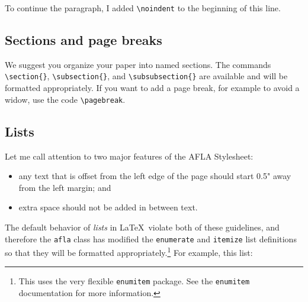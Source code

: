 \documentclass{afla}
\begin{document}
\noindent To continue the paragraph, I added \verb`\noindent` to the beginning of this line.

\subsection{Sections and page breaks}

We suggest you organize your paper into named sections. The commands \verb`\section{}`, \linebreak \verb`\subsection{}`, and \verb`\subsubsection{}` are available and will be formatted appropriately. If you want to add a page break, for example to avoid a widow, use the code \verb`\pagebreak`.%

\subsection{Lists}

Let me call attention to two major features of the AFLA Stylesheet:

\begin{itemize}
\item any text that is offset from the left edge of the page should start 0.5" away from the left margin; and
\item extra space should not be added in between text.
\end{itemize}

\noindent The default behavior of \textit{lists} in \LaTeX\ violate both of these guidelines, and therefore the \verb`afla` class has modified the \verb`enumerate` and \verb`itemize` list definitions so that they will be formatted appropriately.\footnote{This uses the very flexible \texttt{enumitem} package. See the \texttt{enumitem} documentation for more information.} For example, this list:
\end{document}
